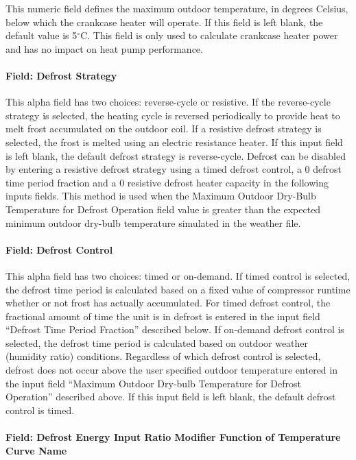This numeric field defines the maximum outdoor temperature, in degrees Celsius, below which the crankcase heater will operate. If this field is left blank, the default value is 5$^\circ$C. This field is only used to calculate crankcase heater power and has no impact on heat pump performance.

\paragraph{Field: Defrost Strategy}\label{field-defrost-strategy-1-000}

This alpha field has two choices: reverse-cycle or resistive. If the reverse-cycle strategy is selected, the heating cycle is reversed periodically to provide heat to melt frost accumulated on the outdoor coil. If a resistive defrost strategy is selected, the frost is melted using an electric resistance heater. If this input field is left blank, the default defrost strategy is reverse-cycle. Defrost can be disabled by entering a resistive defrost strategy using a timed defrost control, a 0 defrost time period fraction and a 0 resistive defrost heater capacity in the following inputs fields. This method is used when the Maximum Outdoor Dry-Bulb Temperature for Defrost Operation field value is greater than the expected minimum outdoor dry-bulb temperature simulated in the weather file.

\paragraph{Field: Defrost Control}\label{field-defrost-control-1-000}

This alpha field has two choices: timed or on-demand. If timed control is selected, the defrost time period is calculated based on a fixed value of compressor runtime whether or not frost has actually accumulated. For timed defrost control, the fractional amount of time the unit is in defrost is entered in the input field ``Defrost Time Period Fraction'' described below. If on-demand defrost control is selected, the defrost time period is calculated based on outdoor weather (humidity ratio) conditions. Regardless of which defrost control is selected, defrost does not occur above the user specified outdoor temperature entered in the input field ``Maximum Outdoor Dry-bulb Temperature for Defrost Operation'' described above. If this input field is left blank, the default defrost control is timed.

\paragraph{Field: Defrost Energy Input Ratio Modifier Function of Temperature Curve Name}\label{field-defrost-energy-input-ratio-modifier-function-of-temperature-curve-name-1}

